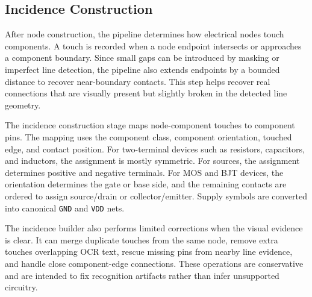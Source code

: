 \subsection{Incidence Construction}
\label{subsec:incidence-construction}

After node construction, the pipeline determines how electrical nodes touch components. A touch is recorded when a node endpoint intersects or approaches a component boundary. Since small gaps can be introduced by masking or imperfect line detection, the pipeline also extends endpoints by a bounded distance to recover near-boundary contacts. This step helps recover real connections that are visually present but slightly broken in the detected line geometry.

The incidence construction stage maps node-component touches to component pins. The mapping uses the component class, component orientation, touched edge, and contact position. For two-terminal devices such as resistors, capacitors, and inductors, the assignment is mostly symmetric. For sources, the assignment determines positive and negative terminals. For MOS and BJT devices, the orientation determines the gate or base side, and the remaining contacts are ordered to assign source/drain or collector/emitter. Supply symbols are converted into canonical \texttt{GND} and \texttt{VDD} nets.

The incidence builder also performs limited corrections when the visual evidence is clear. It can merge duplicate touches from the same node, remove extra touches overlapping OCR text, rescue missing pins from nearby line evidence, and handle close component-edge connections. These operations are conservative and are intended to fix recognition artifacts rather than infer unsupported circuitry.

